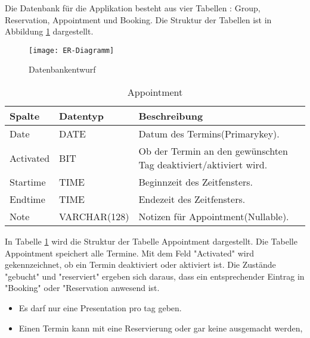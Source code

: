 \documentclass[10pt,a4paper]{article}
\begin{document}
Die Datenbank für die Applikation besteht aus vier Tabellen : Group, Reservation, Appointment und Booking.
Die Struktur der Tabellen ist in Abbildung \ref{fig:ER-Diagramm} dargestellt.

\begin{figure}[ht]		
	\centering
	\texttt{[image: ER-Diagramm]}
	\caption{Datenbankentwurf}
	\label{fig:ER-Diagramm}	
	\end{figure}

\begin{table}[h]
\centering
\caption{Appointment}
	\label{tab:Appointment}   
    \begin{tabular}{| l | l | l | l |}
    \hline
    \rowcolor{lightgray} Spalte & Datentyp & Beschreibung  \\ \hline
    Date  & DATE & Datum des Termins(Primarykey).\\ \hline
    Activated & BIT & Ob der Termin an den gewünschten Tag deaktiviert/aktiviert wird.\\ \hline
    Startime & TIME & Beginnzeit des Zeitfensters. \\ \hline
    Endtime & TIME & Endezeit des Zeitfensters.  \\ \hline
    Note & VARCHAR(128) & Notizen für Appointment(Nullable). \\ \hline
    \end{tabular}
\end{table}


In Tabelle \ref{tab:Appointment} wird die Struktur der Tabelle Appointment dargestellt. Die Tabelle Appointment speichert alle Termine. Mit dem Feld "Activated" wird gekennzeichnet, ob ein Termin deaktiviert oder aktiviert ist. Die Zustände "gebucht" und "reserviert" ergeben sich daraus, dass ein entsprechender Eintrag in "Booking" oder "Reservation anwesend ist.
\begin{itemize}
\item Es darf nur eine Presentation pro tag geben.
\item Einen Termin kann mit eine Reservierung oder gar keine ausgemacht werden, 
\end{itemize}
\end{document}
